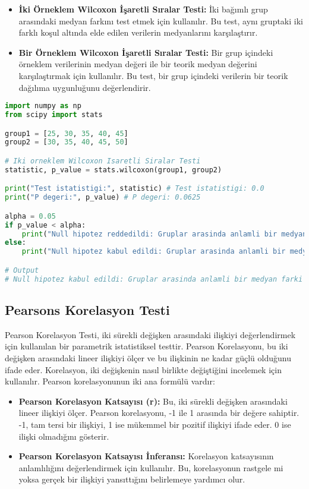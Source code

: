 \begin{itemize}
    \item \textbf{İki Örneklem Wilcoxon İşaretli Sıralar Testi:} İki bağımlı grup arasındaki medyan farkını test etmek için kullanılır. Bu test, aynı gruptaki iki farklı koşul altında elde edilen verilerin medyanlarını karşılaştırır.
    \item \textbf{Bir Örneklem Wilcoxon İşaretli Sıralar Testi:} Bir grup içindeki örneklem verilerinin medyan değeri ile bir teorik medyan değerini karşılaştırmak için kullanılır. Bu test, bir grup içindeki verilerin bir teorik dağılıma uygunluğunu değerlendirir.
\end{itemize}

\begin{lstlisting}[language=Python]
import numpy as np
from scipy import stats

group1 = [25, 30, 35, 40, 45]
group2 = [30, 35, 40, 45, 50]

# Iki orneklem Wilcoxon Isaretli Siralar Testi
statistic, p_value = stats.wilcoxon(group1, group2)

print("Test istatistigi:", statistic) # Test istatistigi: 0.0
print("P degeri:", p_value) # P degeri: 0.0625

alpha = 0.05
if p_value < alpha:
    print("Null hipotez reddedildi: Gruplar arasinda anlamli bir medyan farki vardir.")
else:
    print("Null hipotez kabul edildi: Gruplar arasinda anlamli bir medyan farki yoktur.")

# Output
# Null hipotez kabul edildi: Gruplar arasinda anlamli bir medyan farki yoktur.
\end{lstlisting}

\subsection{Pearsons Korelasyon Testi}
Pearson Korelasyon Testi, iki sürekli değişken arasındaki ilişkiyi değerlendirmek için kullanılan bir parametrik istatistiksel testtir. Pearson Korelasyonu, bu iki değişken arasındaki lineer ilişkiyi ölçer ve bu ilişkinin ne kadar güçlü olduğunu ifade eder. Korelasyon, iki değişkenin nasıl birlikte değiştiğini incelemek için kullanılır. Pearson korelasyonunun iki ana formülü vardır:

\begin{itemize}
    \item \textbf{Pearson Korelasyon Katsayısı (r):} Bu, iki sürekli değişken arasındaki lineer ilişkiyi ölçer. Pearson korelasyonu, -1 ile 1 arasında bir değere sahiptir. -1, tam tersi bir ilişkiyi, 1 ise mükemmel bir pozitif ilişkiyi ifade eder. 0 ise ilişki olmadığını gösterir.
    \item \textbf{Pearson Korelasyon Katsayısı İnferansı:} Korelasyon katsayısının anlamlılığını değerlendirmek için kullanılır. Bu, korelasyonun rastgele mi yoksa gerçek bir ilişkiyi yansıttığını belirlemeye yardımcı olur.
\end{itemize}

